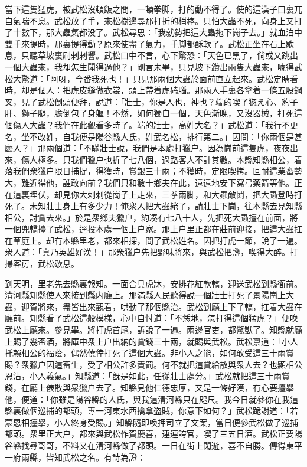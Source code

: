 當下這隻猛虎，被武松沒頓飯之間，一頓拳脚，打的動不得了。使的這漢子口裏兀自氣喘不息。武松放了手，來松樹邊尋那打折的梢棒。只怕大蟲不死，向身上又打了十數下，那大蟲氣都没了。武松尋思：「我就勢把這大蟲拖下崗子去。」就血泊中雙手來提時，那裏提得動？原來使盡了氣力，手脚都酥軟了。武松正坐在石上歇息，只聽草坡裏刷剌剌響。武松口中不言，心下驚恐：「天色已黑了，倘或又跳出一個大蟲來，我却怎生鬦得過他？」剛言未畢，只見坡下鑽出兩隻大蟲來，唬得武松大驚道：「阿呀，今番我死也！」只見那兩個大蟲於面前直立起來。武松定睛看時，却是個人：把虎皮縫做衣裳，頭上帶着虎磕腦。那兩人手裏各拿着一條五股鋼叉，見了武松倒頭便拜，說道：「壯士，你是人也，神也？端的喫了㺀え心、豹子肝、獅子腿，膽倒包了身軀！不然，如何獨自一個，天色漸晚，又沒器械，打死這個傷人大蟲？我們在此觀看多時了。端的壯士，高姓大名？」武松道：「我行不更名，坐不改姓，自我便是陽谷縣人氏，姓武名松，排行第二。」因問：「你兩個是甚麽人？」那兩個道：「不瞞壯士說，我們是本處打獵户。因為崗前這隻虎，夜夜出來，傷人極多。只我們獵户也折了七八個，過路客人不計其數。本縣知縣相公，着落我們衆獵户限日捕捉，得獲時，賞銀三十兩；不獲時，定限喫拷。叵耐這業畜勢大，難近得他，誰敢向前？我們只和數十鄉夫在此，遠遠地安下窝弓藥箭等他。正在這裏埋伏，却見你大剌剌從崗子上走來，三拳兩脚，和大蟲敵鬦，把大蟲登時打死了。未知壯士身上有多少力！俺衆人把大蟲綣了，請壯士下崗，往本縣去見知縣相公，討賞去來。」於是衆鄉夫獵户，約凑有七八十人，先把死大蟲擡在前面，將一個兜轎擡了武松，逕投本䖏一個上户家。那上户里正都在莊前迎接，把這大蟲扛在草庭上。却有本縣里老，都來相探，問了武松姓名。因把打虎一節，說了一遍。衆人道：「真乃英雄好漢！」那衆獵户先把野味將來，與武松把盞，喫得大醉。打掃客房，武松歇息。

到天明，里老先去縣裏報知。一面合具虎牀，安排花紅軟轎，迎送武松到縣衙前。清河縣知縣使人來接到縣内廳上。那滿縣人民聽得說一個壯士打死了景陽崗上大蟲，迎賀將來，盡皆出來觀看，哄動了那個縣治。武松到廳上下了轎，扛着大蟲在廳前。知縣看了武松這般模様，心中自忖道：「不恁地，怎打得這個猛虎？」便唤武松上廳來。參見畢。將打虎首尾，訴說了一遍。兩邊官吏，都驚獃了。知縣就廳上賜了幾盃酒，將庫中衆上户出納的賞錢三十兩，就賜與武松。武松禀道：「小人托賴相公的福蔭，偶然僥倖打死了這個大蟲。非小人之能，如何敢受這三十兩賞賜？衆獵户因這畜生，受了相公許多責罰。何不就把這賞給散與衆人去？也顯相公恩沾，小人義氣。」知縣道：「旣是如此，任從壯士處分。」武松就把這三十兩賞錢，在廳上俵散與衆獵户去了。知縣見他仁德忠厚，又是一條好漢，有心要擡擧他，便道：「你雖是陽谷縣的人氏，與我這清河縣只在咫尺。我今日就參你在我這縣裏做個巡捕的都頭，專一河東水西擒拿盗賊，你意下如何？」武松跪謝道：「若蒙恩相擡擧，小人終身受賜。」知縣隨即喚押司立了文案，當日便參武松做了巡捕都頭。衆里正大户，都來與武松作賀慶喜，連連誇官，喫了三五日酒。武松正要陽谷縣找尋哥哥，不料又在清河縣做了都頭。一日在街上閑遊，喜不自勝。傳得東平一府兩縣，皆知武松之名。有詩為證：

